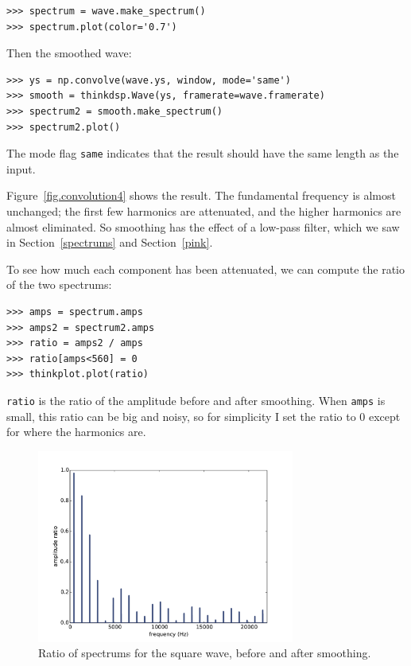 \documentclass[12pt]{book}
\begin{document}
\begin{verbatim}
>>> spectrum = wave.make_spectrum()
>>> spectrum.plot(color='0.7')
\end{verbatim}

Then the smoothed wave:

\begin{verbatim}
>>> ys = np.convolve(wave.ys, window, mode='same')
>>> smooth = thinkdsp.Wave(ys, framerate=wave.framerate)
>>> spectrum2 = smooth.make_spectrum()
>>> spectrum2.plot()
\end{verbatim}

The mode flag {\tt same} indicates that the result should have the
same length as the input.

Figure~\ref{fig.convolution4} shows the result.  The fundamental
frequency is almost unchanged; the first few harmonics are
attenuated, and the higher harmonics are almost eliminated.  So
smoothing has the effect of a low-pass filter, which we
saw in Section~\ref{spectrums} and Section~\ref{pink}.

To see how much each component has been attenuated, we can
compute the ratio of the two spectrums:

\begin{verbatim}
>>> amps = spectrum.amps
>>> amps2 = spectrum2.amps
>>> ratio = amps2 / amps    
>>> ratio[amps<560] = 0
>>> thinkplot.plot(ratio)
\end{verbatim}

{\tt ratio} is the ratio of the amplitude before and after 
smoothing.  When {\tt amps} is small, this ratio can be big
and noisy, so for simplicity I set the ratio to 0 except for
where the harmonics are.

\begin{figure}
\centerline{\includegraphics[height=2.5in]{figs/convolution5.pdf}}
\caption{Ratio of spectrums for the square wave, before and after smoothing.}
\label{fig.convolution5}
\end{figure}
\end{document}
